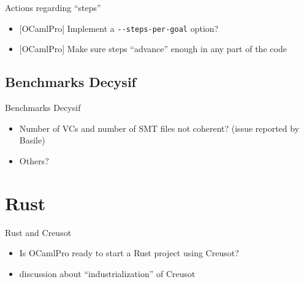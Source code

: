 \documentclass[aspectratio=169]{beamer}
\begin{document}
\begin{frame}{Actions regarding ``steps''}

  \begin{itemize}
  \item{} [OCamlPro] Implement a \texttt{-{}-steps-per-goal} option?
  \item{} [OCamlPro] Make sure steps ``advance'' enough in any part of the code
  \end{itemize}

\end{frame}

\subsection{Benchmarks Decysif}

\begin{frame}{Benchmarks Decysif}

  \begin{itemize}
  \item Number of VCs and number of SMT files not coherent? (issue reported by Basile)
  \item Others?
  \end{itemize}

\end{frame}

\section{Rust}

\begin{frame}{Rust and Creusot}

  \begin{itemize}
  \item Is OCamlPro ready to start a Rust project using Creusot?
  \item{} discussion about ``industrialization'' of Creusot
  \end{itemize}

\end{frame}
\end{document}
